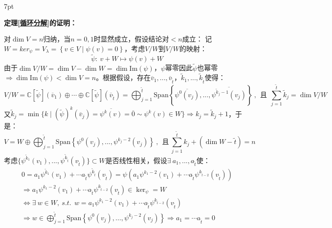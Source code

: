 \documentclass[zihao=-4,UTF8]{report}
\theoremstyle{mystyle} %
\newenvironment{graybox}{%
\def\FrameCommand{%
\hspace{1pt}%
{\color{gray}\small \vrule width 2pt}%
{\color{graybox_color}\vrule width 4pt}%
\colorbox{graybox_color}%
}%
\MakeFramed{\advance\hsize-\width\FrameRestore}%
\noindent\hspace{-4.55pt}%
\begin{adjustwidth}{}{7pt}%
\vspace{2pt}\vspace{2pt}%
}
{%
\vspace{2pt}\end{adjustwidth}\endMakeFramed%
}
\begin{document}
\begin{graybox}
\textbf{定理\ref{循环分解}的证明：}\par\noindent
对$\dim V = n$归纳，当$n = 0,1$时显然成立，假设结论对$<n$成立：
记$W = ker_{\psi} = V_{\lambda} = \left\{v \in V\mid \psi(v)=0 \right\}$，考虑$V/W$到$V/W$的映射：
\begin{equation*}
    \tilde{\psi}:\ v + W \longmapsto \psi(v) + W
\end{equation*}
由于$\dim V/W = \dim V - \dim W = \dim \text{Im} (\psi) $，$\psi$幂零因此$\tilde{\psi}$也幂零$\Longrightarrow \dim \text{Im}(\psi) < \dim V = n$。根据假设，存在$\overline{v}_1,...,\overline{v}_{\tilde{t}}$，$\tilde{k}_1,...,\tilde{k}_{\tilde{t}}$使得：
\begin{equation*}
    V/W = \mathbb{C}[\tilde{\psi}](\overline{v}_1) \oplus \cdots \oplus \mathbb{C}[\tilde{\psi}](\overline{v}_{\tilde{t}}) = \bigoplus_{j =1}^{\tilde{t}} \text{Span}\left\{ \overline{\psi^0(v_j)},...,\overline{\psi^{\tilde{k}_j-1}(v_j)}\right\} \ ,\ \ \text{且}\ \ \sum_{j=1}^{\tilde{t}}\tilde{k}_j = \dim V/W 
\end{equation*}
又$\tilde{k}_j= \min \{ k\mid (\tilde{\psi})^k(\overline{v}_j) = \overline{\psi^k(v)} =\overline{0} \sim \psi^k(v) \in W\} \Longrightarrow k_j = \tilde{k}_j +1$，于是：
\begin{equation*}
    V = W \oplus \bigoplus_{j =1}^{\tilde{t}} \text{Span}\left\{ \psi^0(v_j),...,\psi^{k_j-2}(v_j)\right\}\ ,\ \ \text{且}\ \sum_{j=1}^{\tilde{t}}k_j + (\dim W - \tilde{t}) = n
\end{equation*}
考虑$\{\psi^{\tilde{k}_1}(v_1),...,\psi^{\tilde{k}_{\tilde{t}}}(v_{\tilde{t}})\} \subset W$是否线性相关，假设$\exists\  a_1,...,a_{\tilde{t}}$使：
\begin{gather*}
    0 = a_1\psi^{\tilde{k}_1}(v_1) + \cdots a_{\tilde{t}}\psi^{\tilde{k}_{\tilde{t}}}(v_{\tilde{t}}) = \psi \left( a_1\psi^{k_1-2}(v_1) + \cdots a_{\tilde{t}}\psi^{k_{\tilde{t}-2}}(v_{\tilde{t}})\right)\\
     \Longrightarrow 
      a_1\psi^{k_1-2}(v_1) + \cdots a_{\tilde{t}}\psi^{k_{\tilde{t}-2}}(v_{\tilde{t}}) \in \ker_{\psi} = W \\
     \Longleftrightarrow 
     \exists\   w \in W , \ s.t.\ \   w =  a_1\psi^{k_1-2}(v_1) + \cdots a_{\tilde{t}}\psi^{k_{\tilde{t}-2}}(v_{\tilde{t}})\\
     \Longrightarrow  
     w \in \bigoplus_{j =1}^{\tilde{t}} \text{Span}\left\{ \psi^0(v_j),...,\psi^{k_j-2}(v_j)\right\} 
     \Longrightarrow a_1 = \cdots a_{\tilde{t}} = 0
\end{gather*}

\end{graybox}
\end{document}
